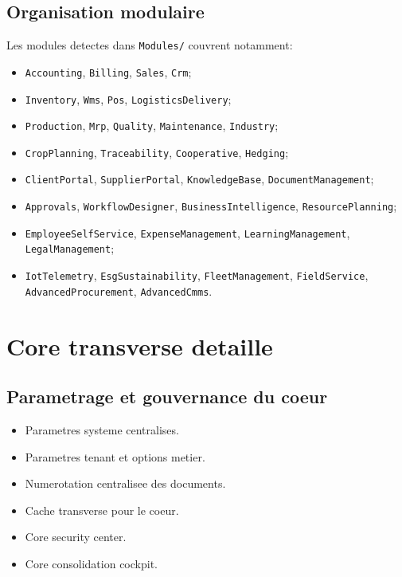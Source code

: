 \documentclass[11pt,a4paper]{article}
\begin{document}
\subsection{Organisation modulaire}
Les modules detectes dans \texttt{Modules/} couvrent notamment:
\begin{itemize}[leftmargin=1.2cm]
    \item \texttt{Accounting}, \texttt{Billing}, \texttt{Sales}, \texttt{Crm};
    \item \texttt{Inventory}, \texttt{Wms}, \texttt{Pos}, \texttt{LogisticsDelivery};
    \item \texttt{Production}, \texttt{Mrp}, \texttt{Quality}, \texttt{Maintenance}, \texttt{Industry};
    \item \texttt{CropPlanning}, \texttt{Traceability}, \texttt{Cooperative}, \texttt{Hedging};
    \item \texttt{ClientPortal}, \texttt{SupplierPortal}, \texttt{KnowledgeBase}, \texttt{DocumentManagement};
    \item \texttt{Approvals}, \texttt{WorkflowDesigner}, \texttt{BusinessIntelligence}, \texttt{ResourcePlanning};
    \item \texttt{EmployeeSelfService}, \texttt{ExpenseManagement}, \texttt{LearningManagement}, \texttt{LegalManagement};
    \item \texttt{IotTelemetry}, \texttt{EsgSustainability}, \texttt{FleetManagement}, \texttt{FieldService}, \texttt{AdvancedProcurement}, \texttt{AdvancedCmms}.
\end{itemize}

\section{Core transverse detaille}
\subsection{Parametrage et gouvernance du coeur}
\begin{itemize}[leftmargin=1.2cm]
    \item Parametres systeme centralises.
    \item Parametres tenant et options metier.
    \item Numerotation centralisee des documents.
    \item Cache transverse pour le coeur.
    \item Core security center.
    \item Core consolidation cockpit.
\end{itemize}
\end{document}
